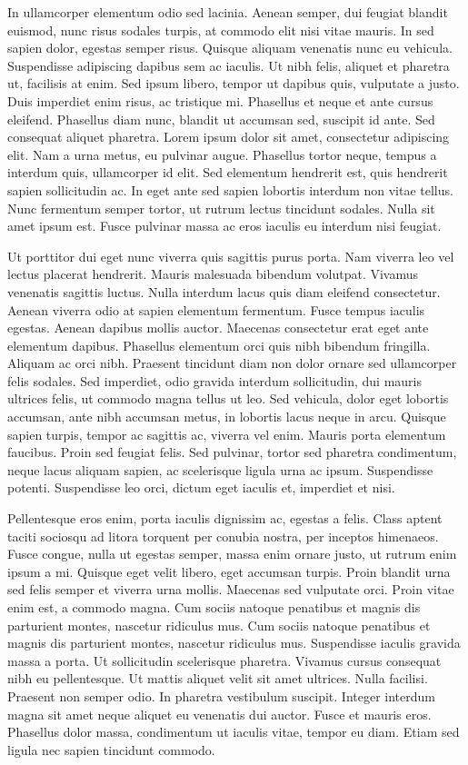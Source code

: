In ullamcorper elementum odio sed lacinia. Aenean semper, dui feugiat
blandit euismod, nunc risus sodales turpis, at commodo elit nisi vitae
mauris. In sed sapien dolor, egestas semper risus. Quisque aliquam
venenatis nunc eu vehicula. Suspendisse adipiscing dapibus sem ac
iaculis. Ut nibh felis, aliquet et pharetra ut, facilisis at enim. Sed
ipsum libero, tempor ut dapibus quis, vulputate a justo. Duis
imperdiet enim risus, ac tristique mi. Phasellus et neque et ante
cursus eleifend. Phasellus diam nunc, blandit ut accumsan sed,
suscipit id ante. Sed consequat aliquet pharetra. Lorem ipsum dolor
sit amet, consectetur adipiscing elit. Nam a urna metus, eu pulvinar
augue. Phasellus tortor neque, tempus a interdum quis, ullamcorper id
elit. Sed elementum hendrerit est, quis hendrerit sapien sollicitudin
ac. In eget ante sed sapien lobortis interdum non vitae tellus. Nunc
fermentum semper tortor, ut rutrum lectus tincidunt sodales. Nulla sit
amet ipsum est. Fusce pulvinar massa ac eros iaculis eu interdum nisi
feugiat.

Ut porttitor dui eget nunc viverra quis sagittis purus porta. Nam
viverra leo vel lectus placerat hendrerit. Mauris malesuada bibendum
volutpat. Vivamus venenatis sagittis luctus. Nulla interdum lacus quis
diam eleifend consectetur. Aenean viverra odio at sapien elementum
fermentum. Fusce tempus iaculis egestas. Aenean dapibus mollis
auctor. Maecenas consectetur erat eget ante elementum
dapibus. Phasellus elementum orci quis nibh bibendum
fringilla. Aliquam ac orci nibh. Praesent tincidunt diam non dolor
ornare sed ullamcorper felis sodales. Sed imperdiet, odio gravida
interdum sollicitudin, dui mauris ultrices felis, ut commodo magna
tellus ut leo. Sed vehicula, dolor eget lobortis accumsan, ante nibh
accumsan metus, in lobortis lacus neque in arcu. Quisque sapien
turpis, tempor ac sagittis ac, viverra vel enim. Mauris porta
elementum faucibus. Proin sed feugiat felis. Sed pulvinar, tortor sed
pharetra condimentum, neque lacus aliquam sapien, ac scelerisque
ligula urna ac ipsum. Suspendisse potenti. Suspendisse leo orci,
dictum eget iaculis et, imperdiet et nisi.

Pellentesque eros enim, porta iaculis dignissim ac, egestas a
felis. Class aptent taciti sociosqu ad litora torquent per conubia
nostra, per inceptos himenaeos. Fusce congue, nulla ut egestas semper,
massa enim ornare justo, ut rutrum enim ipsum a mi. Quisque eget velit
libero, eget accumsan turpis. Proin blandit urna sed felis semper et
viverra urna mollis. Maecenas sed vulputate orci. Proin vitae enim
est, a commodo magna. Cum sociis natoque penatibus et magnis dis
parturient montes, nascetur ridiculus mus. Cum sociis natoque
penatibus et magnis dis parturient montes, nascetur ridiculus
mus. Suspendisse iaculis gravida massa a porta. Ut sollicitudin
scelerisque pharetra. Vivamus cursus consequat nibh eu
pellentesque. Ut mattis aliquet velit sit amet ultrices. Nulla
facilisi. Praesent non semper odio. In pharetra vestibulum
suscipit. Integer interdum magna sit amet neque aliquet eu venenatis
dui auctor. Fusce et mauris eros. Phasellus dolor massa, condimentum
ut iaculis vitae, tempor eu diam. Etiam sed ligula nec sapien
tincidunt commodo.

